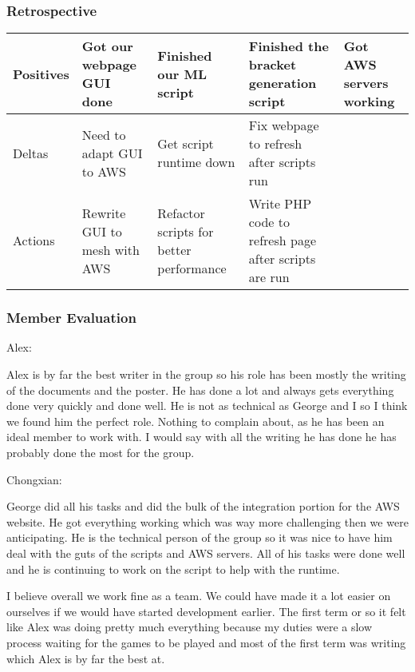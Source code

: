 \documentclass[letterpaper, 10pt,titlepage]{article}
\begin{document}
\subsubsection{Retrospective}
\begin{center}
\begin{tabular}{ | m{.3em} | m{.3cm}| m{.3cm} | } 
\hline
Positives& Got our webpage GUI done & Finished our ML script & Finished the bracket generation script & Got AWS servers working\\ 
\hline
Deltas & Need to adapt GUI to AWS & Get script runtime down & Fix webpage to refresh after scripts run \\ 
\hline
Actions & Rewrite GUI to mesh with AWS & Refactor scripts for better performance & Write PHP code to refresh page after scripts are run \\ 
\hline
\end{tabular}
\end{center}



\subsubsection{Member Evaluation}
Alex: 
\par Alex is by far the best writer in the group so his role has been mostly the writing of the documents and the poster.  He has done a lot and always gets everything done very quickly and done well.  He is not as technical as George and I so I think we found him the perfect role. Nothing to complain about, as he has been an ideal member to work with. I would say with all the writing he has done he has probably done the most for the group.

Chongxian: 
\par George did all his tasks and did the bulk of the integration portion for the AWS website. He got everything working which was way more challenging then we were anticipating. He is the technical person of the group so it was nice to have him deal with the guts of the scripts and AWS servers. All of his tasks were done well and he is continuing to work on the script to help with the runtime.

\par I believe overall we work fine as a team. We could have made it a lot easier on ourselves if we would have started development earlier.  The first term or so it felt like Alex was doing pretty much everything because my duties were a slow process waiting for the games to be played and most of the first term was writing which Alex is by far the best at.
\end{document}
